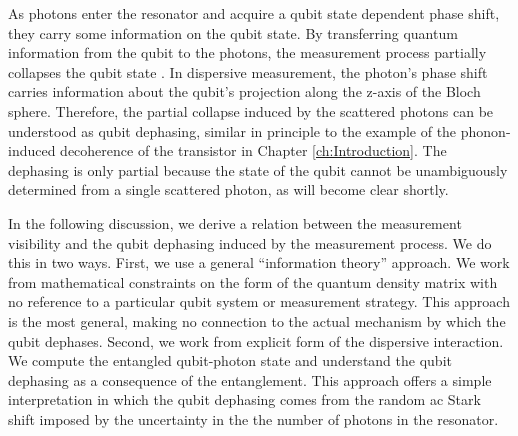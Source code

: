  \label{sec:measurementInducedDephasing}

As photons enter the resonator and acquire a qubit state dependent phase shift, they carry some information on the qubit state.
By transferring quantum information from the qubit to the photons, the measurement process partially collapses the qubit state \cite{Murch:trajectories2013}.
In dispersive measurement, the photon's phase shift carries information about the qubit's projection along the z-axis of the Bloch sphere.
Therefore, the partial collapse induced by the scattered photons can be understood as qubit dephasing, similar in principle to the example of the phonon-induced decoherence of the transistor in Chapter \ref{ch:Introduction}.
The dephasing is only partial because the state of the qubit cannot be unambiguously determined from a single scattered photon, as will become clear shortly.

In the following discussion, we derive a relation between the measurement visibility and the qubit dephasing induced by the measurement process.
We do this in two ways.
First, we use a general ``information theory'' approach.
We work from mathematical constraints on the form of the quantum density matrix with no reference to a particular qubit system or measurement strategy.
This approach is the most general, making no connection to the actual mechanism by which the qubit dephases.
Second, we work from explicit form of the dispersive interaction.
We compute the entangled qubit-photon state and understand the qubit dephasing as a consequence of the entanglement.
This approach offers a simple interpretation in which the qubit dephasing comes from the random ac Stark shift imposed by the uncertainty in the the number of photons in the resonator.



